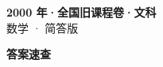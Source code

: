 \documentclass[zihao=-4, a4paper]{ctexart}
\begin{document}
\begin{center}
  {\Large\bfseries 2000 年·全国旧课程卷·文科}\\[4pt]
  {\large 数学 · 简答版}
\end{center}
\medskip
{}

\clearpage
{}
\begin{center}{\Large\bfseries 答案速查}\end{center}
\medskip

\end{document}
